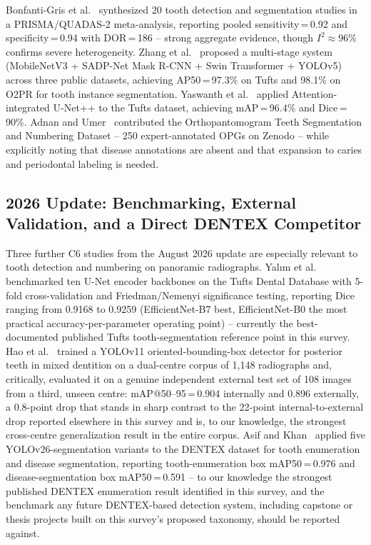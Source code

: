 \documentclass[conference]{IEEEtran}
\begin{document}
Bonfanti-Gris et al.~\cite{bonfanti2025deep} synthesized 20 tooth
detection and segmentation studies in a PRISMA/QUADAS-2 meta-analysis,
reporting pooled sensitivity\,=\,0.92 and specificity\,=\,0.94 with
DOR\,=\,186 -- strong aggregate evidence, though $I^2 \approx 96\%$
confirms severe heterogeneity. Zhang et al.~\cite{zhang2025reliable}
proposed a multi-stage system (MobileNetV3 + SADP-Net Mask R-CNN + Swin
Transformer + YOLOv5) across three public datasets, achieving
AP50\,=\,97.3\% on Tufts and 98.1\% on O2PR for tooth instance
segmentation. Yaswanth et al.~\cite{yaswanth2025automated} applied
Attention-integrated U-Net++ to the Tufts dataset, achieving
mAP\,=\,96.4\% and Dice\,=\,90\%. Adnan and
Umer~\cite{adnan2024orthopantomogram} contributed the Orthopantomogram
Teeth Segmentation and Numbering Dataset -- 250 expert-annotated OPGs on
Zenodo -- while explicitly noting that disease annotations are absent and
that expansion to caries and periodontal labeling is needed.

\subsection{2026 Update: Benchmarking, External Validation, and a Direct DENTEX Competitor}

Three further C6 studies from the August 2026 update are especially
relevant to tooth detection and numbering on panoramic radiographs.
Yal{\i}m et al.~\cite{yalim2026comparative} benchmarked ten U-Net
encoder backbones on the Tufts Dental Database with 5-fold
cross-validation and Friedman/Nemenyi significance testing, reporting
Dice ranging from 0.9168 to 0.9259 (EfficientNet-B7 best,
EfficientNet-B0 the most practical accuracy-per-parameter operating
point) -- currently the best-documented published Tufts
tooth-segmentation reference point in this survey. Hao et
al.~\cite{hao2026robust} trained a YOLOv11 oriented-bounding-box
detector for posterior teeth in mixed dentition on a dual-centre
corpus of 1,148 radiographs and, critically, evaluated it on a genuine
independent external test set of 108 images from a third, unseen
centre: mAP@50--95\,=\,0.904 internally and 0.896 externally, a
0.8-point drop that stands in sharp contrast to the 22-point
internal-to-external drop reported elsewhere in this survey
\cite{muresanu2024automating} and is, to our knowledge, the strongest
cross-centre generalization result in the entire corpus. Asif and
Khan~\cite{asif2026yolo26} applied five YOLOv26-segmentation variants
to the DENTEX dataset for tooth enumeration and disease segmentation,
reporting tooth-enumeration box mAP50\,=\,0.976 and
disease-segmentation box mAP50\,=\,0.591 -- to our knowledge the
strongest published DENTEX enumeration result identified in this
survey, and the benchmark any future DENTEX-based detection system,
including capstone or thesis projects built on this survey's proposed
taxonomy, should be reported against.
\end{document}
